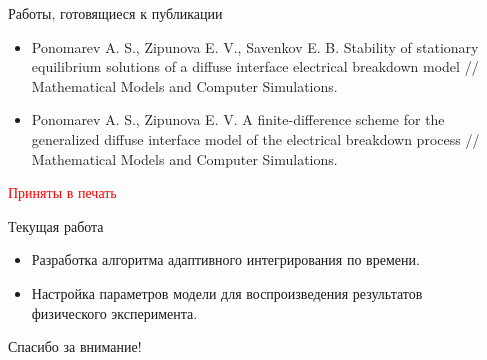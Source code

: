 \documentclass[aspectratio=169]{beamer}
\begin{document}
\begin{frame}{Работы, готовящиеся к публикации}
\begin{itemize}
	\item Ponomarev A. S., Zipunova E. V., Savenkov E. B. Stability of stationary equilibrium solutions of a diffuse interface electrical breakdown model // Mathematical Models and Computer Simulations.
	\item Ponomarev A. S., Zipunova E. V. A finite-difference scheme for the generalized diffuse interface model of the electrical breakdown process // Mathematical Models and Computer Simulations.
\end{itemize}
\textcolor{red}{Приняты в печать}
\end{frame}


\begin{frame}{Текущая работа}
\begin{itemize}
	\item Разработка алгоритма адаптивного интегрирования по времени.
	\item Настройка параметров модели для воспроизведения результатов \\ физического эксперимента.
\end{itemize}
\end{frame}


\begin{frame}{}
\begin{center}
	\Large
	Спасибо за внимание!
\end{center}
\end{frame}
\end{document}
